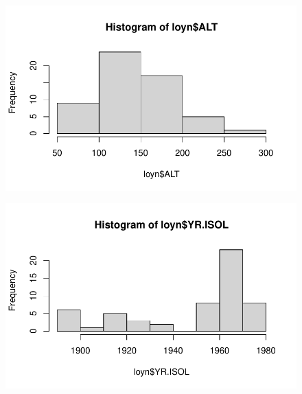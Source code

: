\documentclass[
  10pt,
  letterpaper,
  DIV=11,
  numbers=noendperiod]{scrartcl}
\newenvironment{Shaded}{\begin{snugshade}}{\end{snugshade}}
\newcommand{\FunctionTok}[1]{\textcolor[rgb]{0.28,0.35,0.67}{#1}}
\newcommand{\NormalTok}[1]{\textcolor[rgb]{0.00,0.23,0.31}{#1}}
\newcommand{\SpecialCharTok}[1]{\textcolor[rgb]{0.37,0.37,0.37}{#1}}
\begin{document}
\begin{Shaded}
\end{Shaded}

\begin{figure}[H]

{\centering \includegraphics{ENVX2001-2024-Lab07_files/figure-pdf/unnamed-chunk-2-2.pdf}

}

\end{figure}

\begin{Shaded}
\end{Shaded}

\begin{figure}[H]

{\centering \includegraphics{ENVX2001-2024-Lab07_files/figure-pdf/unnamed-chunk-2-3.pdf}

}

\end{figure}
\end{document}
